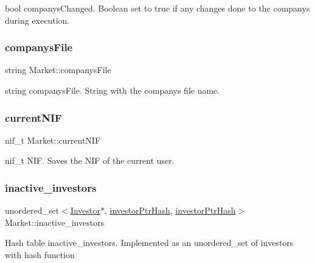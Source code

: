 bool companys\+Changed. Boolean set to true if any changes done to the companys during execution. \mbox{\label{class_market_a5c33b787200b05b9e680eed5ec055fc7}} 
\subsubsection{\texorpdfstring{companys\+File}{companysFile}}
{\footnotesize\ttfamily string Market\+::companys\+File\hspace{0.3cm}{\ttfamily [private]}}

string companys\+File. String with the company\textquotesingle{}s file name. \mbox{\label{class_market_a3ff92b5217f5283b80f7da79d4d42500}} 
\subsubsection{\texorpdfstring{current\+N\+IF}{currentNIF}}
{\footnotesize\ttfamily nif\+\_\+t Market\+::current\+N\+IF\hspace{0.3cm}{\ttfamily [private]}}

nif\+\_\+t N\+IF. Saves the N\+IF of the current user. \mbox{\label{class_market_a3dcdf435fbc6b0d509f047842e22c618}} 
\subsubsection{\texorpdfstring{inactive\+\_\+investors}{inactive\_investors}}
{\footnotesize\ttfamily unordered\+\_\+set$<$\hyperlink{class_investor}{Investor}$\ast$, \hyperlink{structinvestor_ptr_hash}{investor\+Ptr\+Hash}, \hyperlink{structinvestor_ptr_hash}{investor\+Ptr\+Hash}$>$ Market\+::inactive\+\_\+investors\hspace{0.3cm}{\ttfamily [private]}}

Hash table inactive\+\_\+investors. Implemented as an unordered\+\_\+set of investors with hash function \mbox{\label{class_market_afae1c420d61b02ec9130e80f2a85404b}} 

